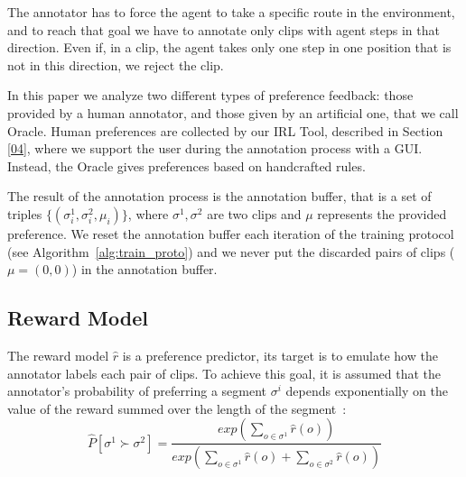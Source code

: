 The annotator has to force the agent to take a specific route in the environment, and to reach that goal we have to annotate only clips with agent steps in that direction. Even if, in a clip, the agent takes only one step in one position that is not in this direction, we reject the clip. 

In this paper we analyze two different types of preference feedback: those provided by a human annotator, and those given by an artificial one, that we call Oracle. Human preferences are collected by our IRL Tool, described in Section \ref{04}, where we support the user during the annotation process with a GUI. Instead, the Oracle gives preferences based on handcrafted rules.

The result of the annotation process is the annotation buffer, that is a set of triples $\{(\sigma^1_i, \sigma^2_i, \mu_i)\}$, where $\sigma^1, \sigma^2$ are two clips and $\mu$ represents the provided preference. We reset the annotation buffer each iteration of the training protocol (see Algorithm\ \ref{alg:train_proto}) and we never put the discarded pairs of clips ($\mu=(0,0)$) in the annotation buffer.


\subsection{Reward Model}
The reward model $\hat{r}$ is a preference predictor, its target is to emulate how the annotator labels each pair of clips. To achieve this goal, it is assumed that the annotator's probability of preferring a segment $\sigma^i$ depends exponentially on the value of the reward summed over the length of the segment\ \cite{NIPS2018_8025}:
\begin{equation}
    \hat{P}[\sigma^1 \succ \sigma^2] = \frac{exp(\sum_{o \in \sigma^1} \hat{r}(o))}{exp(\sum_{o \in \sigma^1} \hat{r}(o) + \sum_{o \in \sigma^2} \hat{r}(o))}
\end{equation}

